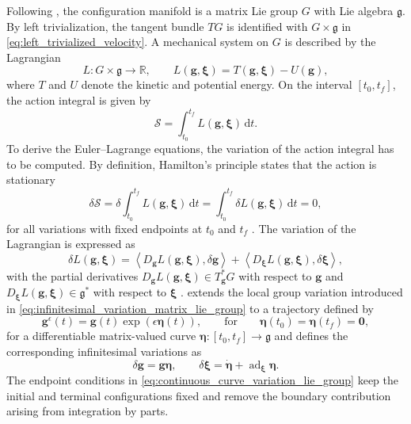 Following \cite{Lee2008}, the configuration manifold is a matrix Lie group $G$ with Lie algebra $\mathfrak g$. By left trivialization, the tangent bundle $TG$ is identified with $G\times\mathfrak g$ in \eqref{eq:left_trivialized_velocity}.
A mechanical system on $G$ is described by the Lagrangian
\begin{equation}
    L:G\times\mathfrak g\rightarrow\mathbb R,
    \qquad
    L(\bm{g},\bm{\xi})=T(\bm{g},\bm{\xi})-U(\bm{g}),
    \label{eq:continuous_lagrangian_lie_group}
\end{equation}
where $T$ and $U$ denote the kinetic and potential energy. On the interval $[t_0,t_f]$, the action integral is given by
\begin{equation}
    \mathcal S
    =
    \int_{t_0}^{t_f}L(\bm{g},\bm{\xi})\,\mathrm dt.
    \label{eq:continuous_action_integral}
\end{equation}
To derive the Euler--Lagrange equations, the variation of the action integral has to be computed. By definition, Hamilton's principle states that the action is stationary
\begin{equation}
    \delta\mathcal S
    =
    \delta\int_{t_0}^{t_f}L(\bm{g},\bm{\xi})\,\mathrm dt
    =
    \int_{t_0}^{t_f}\delta L(\bm{g},\bm{\xi})\,\mathrm dt
    =
    0,
    \label{eq:hamilton_principle_lie_group}
\end{equation}
for all variations with fixed endpoints at $t_0$ and $t_f$ \cite{Marsden2001}.
The variation of the Lagrangian is expressed as
\begin{equation}
    \delta L(\bm{g},\bm{\xi})
    =
    \left\langle D_{\bm{g}}L(\bm{g},\bm{\xi}),\delta\bm{g}\right\rangle
    +
    \left\langle D_{\bm{\xi}}L(\bm{g},\bm{\xi}),\delta\bm{\xi}\right\rangle,
    \label{eq:variation_continuous_lagrangian}
\end{equation}
with the partial derivatives $D_{\bm{g}}L(\bm{g},\bm{\xi})\in T_{\bm{g}}^*G$ with respect to $\bm{g}$ and $D_{\bm{\xi}}L(\bm{g},\bm{\xi})\in\mathfrak g^*$ with respect to $\bm{\xi}$ \cite{Marsden2001}.
\cite{Lee2008} extends the local group variation introduced in \eqref{eq:infinitesimal_variation_matrix_lie_group} to a trajectory defined by
\begin{equation}
    \bm{g}^{\epsilon}(t)
    =
    \bm{g}(t)\exp(\epsilon\bm{\eta}(t)),
    \qquad
    \text{for}
    \qquad
    \bm{\eta}(t_0)=\bm{\eta}(t_f)=\bm{0},
    \label{eq:continuous_curve_variation_lie_group}
\end{equation}
for a differentiable matrix-valued curve $\bm{\eta}:[t_0,t_f]\rightarrow\mathfrak g$ and defines the corresponding infinitesimal variations as
\begin{equation}
    \delta\bm{g}=\bm{g}\bm{\eta},
    \qquad
    \delta\bm{\xi}
    =
    \dot{\bm{\eta}}+\operatorname{ad}_{\bm{\xi}}\bm{\eta}.
    \label{eq:continuous_lie_group_variations}
\end{equation}
The endpoint conditions in \eqref{eq:continuous_curve_variation_lie_group} keep the initial and terminal configurations fixed and remove the boundary contribution arising from integration by parts.

